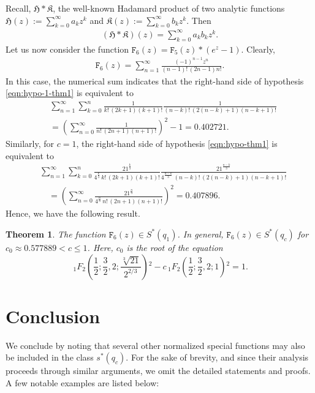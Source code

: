 \documentclass[a4paper,11pt,reqno]{amsart}
\newtheorem{theorem}{Theorem}[section]
\begin{document}
Recall, $\mathfrak{H} \ast \mathfrak{K}$, the well-known Hadamard product of two analytic functions 
 $\mathfrak{H}(z) := \sum_{k=0}^{\infty} a_k z^k $ and $\mathfrak{K}(z):= \sum_{k=0}^{\infty} b_k z^k $. Then 
\begin{align*}
   (\mathfrak{H} \ast \mathfrak{K})(z )= \sum_{k=0}^{\infty} a_k b_k z^k.
\end{align*}
Let us now consider the function $\mathtt{F}_{6}(z)=\mathtt{F}_{5}(z) \ast  (e^z-1)$. Clearly, 
\begin{align}\label{eq:erf-normalizations}
\mathtt{F}_{6}(z) =   \sum_{n=1}^{\infty} \frac{(-1)^{n-1} z^{n}}{(n-1)!\,(2n-1) n!}.
\end{align}
In this case, the numerical sum indicates that 
the right-hand side of hypothesis \eqref{eqn:hypo-1-thm1} is equivalent to 
\begin{align*}
  &\sum_{n=1}^{\infty} \sum_{k=0}^n \frac{1}{k!\,(2k+1) (k+1)!} \frac{1}{(n-k)!\,(2(n-k)+1) (n-k+1)!}\\
  &=  \left(\sum_{n=0}^{\infty} \frac{1}{n!\,(2n+1)(n+1)!} \right)^2 -1=0.402721. 
\end{align*}
Similarly, for $c=1$, the right-hand side of hypothesis \eqref{eqn:hypo-thm1} is equivalent to 
\begin{align*}
  &\sum_{n=1}^{\infty} \sum_{k=0}^n \frac{21^{\tfrac{k}{3}}}{4^{\tfrac{k}{3}}\, k!\,(2k+1) (k+1)!} \frac{21^{\tfrac{n-k}{3}}}{4^{\tfrac{n-k}{3}}\,(n-k)!\,(2(n-k)+1) (n-k+1)!} \\
  &\quad =  \left(\sum_{n=0}^{\infty} \frac{21^{\tfrac{n}{3}}}{4^{\tfrac{n}{3}}\, n!\,(2n+1)(n+1)!} \right)^2 =0.407896. 
\end{align*}
Hence, we have the following result. 
\begin{theorem}
    The function $\mathtt{F}_{6}(z) \in S^{\ast}(q_1)$. In general, $\mathtt{F}_{6}(z) \in S^{\ast}(q_c)$ for $ c_0 \approx 0.577889 < c \le 1$. Here, $c_0$ is the root of the equation 
    \[\, _1F_2\left(\frac{1}{2};\frac{3}{2},2;\frac{\sqrt[3]{21}}{2^{2/3}}\right){}^2-c \, _1F_2\left(\frac{1}{2};\frac{3}{2},2;1\right){}^2=1.\]
\end{theorem}


\section{Conclusion} \label{sec:conclusion}
We conclude by noting that several other normalized special functions may also be included in the class $s^{\ast}(q_c)$. 
 For the sake of brevity, and since their analysis proceeds through similar arguments, we omit the detailed statements and proofs. A few notable examples are listed below:
\end{document}
